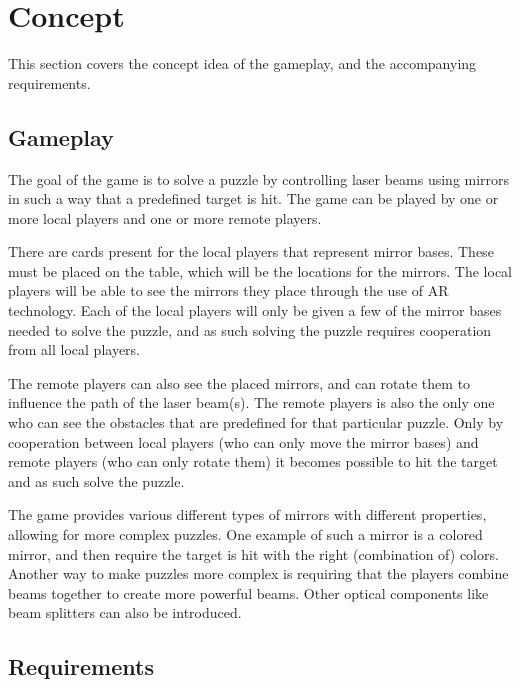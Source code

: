 \section{Concept}
This section covers the concept idea of the gameplay, and the accompanying
requirements.

\subsection{Gameplay}
The goal of the game is to solve a puzzle by controlling laser beams using mirrors
in such a way that a predefined target is hit. The game can be played by 
one or more local players and one or more remote players.

There are cards present for the local players that represent mirror bases. These 
must be placed on the table, which will be the locations for the mirrors. The local
players will be able to see the mirrors they place through the use of AR technology.
Each of the local players will only be given a few of the mirror bases needed to solve
the puzzle, and as such solving the puzzle requires cooperation from all local players.

The remote players can also see the placed mirrors, and can rotate them to influence 
the path of the laser beam(s). The remote players is also the only one who can see the
obstacles that are predefined for that particular puzzle. Only by cooperation between 
local players (who can only move the mirror bases) and remote players (who can only 
rotate them) it becomes possible to hit the target and as such solve the puzzle.

The game provides various different types of mirrors with different properties, 
allowing for more complex puzzles. One example of such a mirror is a colored mirror, 
and then require the target is hit with the right (combination of) colors. Another 
way to make puzzles more complex is requiring that the players combine beams together
to create more powerful beams. Other optical components like beam splitters can
also be introduced.

\subsection{Requirements}


